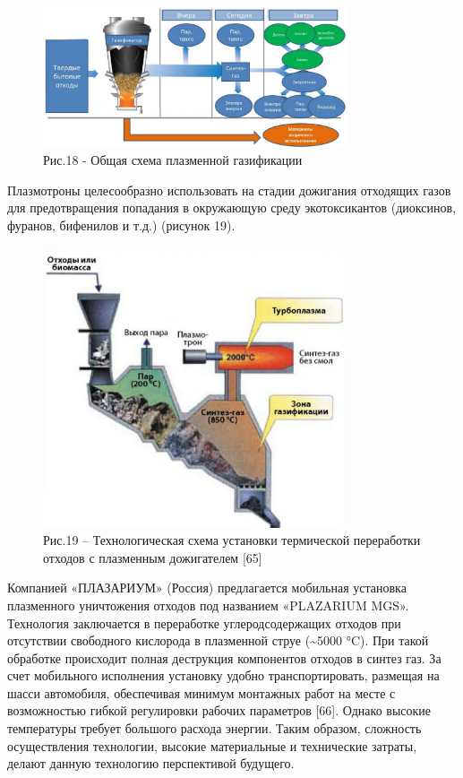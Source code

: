 \begin{figure}[H]
	\centering
	\includegraphics[width=0.8\textwidth]{media/chem2/image82}
	\caption*{Рис.18 - Общая схема плазменной газификации}
\end{figure}

Плазмотроны целесообразно использовать на стадии дожигания отходящих
газов для предотвращения попадания в окружающую среду экотоксикантов
(диоксинов, фуранов, бифенилов и т.д.) (рисунок 19).

\begin{figure}[H]
	\centering
	\includegraphics[width=0.8\textwidth]{media/chem2/image83}
	\caption*{Рис.19 -- Технологическая схема установки термической переработки отходов с плазменным дожигателем {[}65{]}}
\end{figure}

Компанией «ПЛАЗАРИУМ» (Россия) предлагается мобильная установка
плазменного уничтожения отходов под названием «PLAZARIUM MGS».
Технология заклю­чается в переработке углеродсодержащих отходов при
отсутствии свободного кислорода в плазменной струе (\textasciitilde5000
°C). При такой обработке происходит полная деструкция компонентов
отходов в синтез газ. За счет мобильного исполнения установку удобно
транспорти­ровать, размещая на шасси автомобиля, обеспечивая минимум
монтажных работ на месте с возможностью гибкой регулировки рабочих
параметров {[}66{]}. Однако высокие температуры требует большого расхода
энергии. Таким образом, сложность осуществления технологии, высокие
материальные и технические затраты, делают данную технологию
перспективой будущего.

